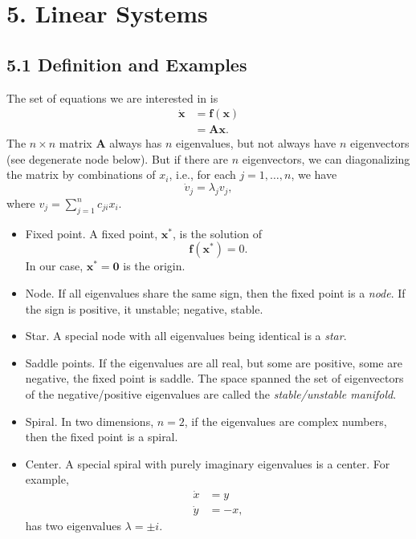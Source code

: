 \documentclass{book}
\begin{document}
\chapter{5. Linear Systems}

\section{5.1 Definition and Examples}

The set of equations we are interested in is
$$
\begin{aligned}
  \mathbf {\dot x}
  &= \mathbf f(\mathbf x) \\
  &= \mathbf A \mathbf x.
\end{aligned}
$$
The $n\times n$ matrix $\mathbf A$ always has $n$ eigenvalues,
but not always have $n$ eigenvectors (see degenerate node below).
But if there are $n$ eigenvectors,
we can diagonalizing the matrix by combinations of $x_i$,
i.e., for each $j = 1, \dots, n$, we have
$$
\dot v_j = \lambda_j v_j,
$$
where $v_j = \sum_{j = 1}^n c_{ji} x_i$.

\begin{itemize}

\item
Fixed point. A fixed point, $\mathbf x^*$, is the solution of
$$
\mathbf f(\mathbf x^*) = 0.
$$
In our case, $\mathbf x^* = \mathbf 0$ is the origin.
\\

\item
Node.
If all eigenvalues share the same sign, then the fixed point is a \emph{node}.
If the sign is positive, it unstable; negative, stable.
\\

\item
Star.
A special node with all eigenvalues being identical is a \emph{star}.

\item
Saddle points.
If the eigenvalues are all real, but some are positive, some are negative, the fixed point is saddle.
The space spanned the set of eigenvectors of the negative/positive eigenvalues are called the \emph{stable/unstable manifold}.

\item
Spiral.
In two dimensions, $n = 2$,
if the eigenvalues are complex numbers, then the fixed point is a spiral.

\item
Center.
A special spiral with purely imaginary eigenvalues is a center. For example,
\begin{align*}
  \dot x &= y \\
  \dot y &= -x,
\end{align*}
has two eigenvalues $\lambda = \pm i$.

\end{itemize}
\end{document}

